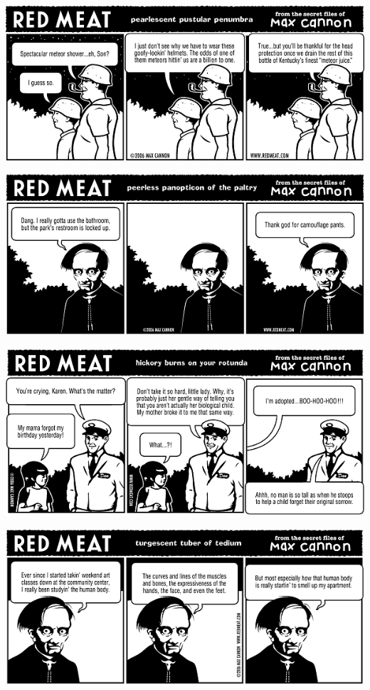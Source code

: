 \documentclass[a4paper,twoside,11pt]{article}
\begin{document}
\includegraphics[width=\textwidth]{redmeat_2006-11-21.png}



\includegraphics[width=\textwidth]{redmeat_2006-11-28.png}



\includegraphics[width=\textwidth]{redmeat_2006-12-05.png}



\includegraphics[width=\textwidth]{redmeat_2006-12-12.png}
\end{document}
